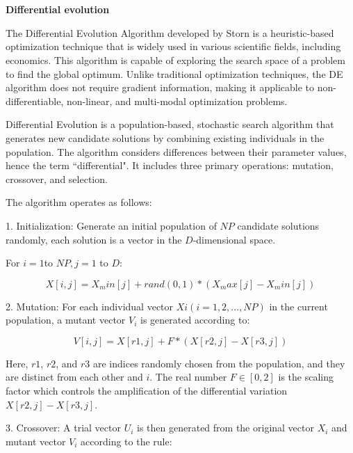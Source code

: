 \documentclass[a4paper,12pt]{article}
\newcommand{\citeyearonly}[1]{\citeyearpar{#1}}
\begin{document}
\newpage

%




\clearpage

\appendix
\section{}\label{appendix:Differential evolution}
\textbf{Differential evolution}

The Differential Evolution Algorithm developed by Storn \citeyearonly{storn1997differential} is a heuristic-based optimization technique that is widely used in various scientific fields, including economics. This algorithm is capable of exploring the search space of a problem to find the global optimum. Unlike traditional optimization techniques, the DE algorithm does not require gradient information, making it applicable to non-differentiable, non-linear, and multi-modal optimization problems.

Differential Evolution is a population-based, stochastic search algorithm that generates new candidate solutions by combining existing individuals in the population. The algorithm considers differences between their parameter values, hence the term ``differential". It includes three primary operations: mutation, crossover, and selection.

The algorithm operates as follows:

1. Initialization: Generate an initial population of $NP$ candidate solutions randomly, each solution is a vector in the $D$-dimensional space.
    
    For $i = 1 $to $NP, j = 1$ to $D$:
    
    $$X[i, j] = X_min[j] + rand(0, 1) * (X_max[j] - X_min[j])$$
    
2. Mutation: For each individual vector $Xi (i=1, 2, ..., NP)$ in the current population, a mutant vector $V_i$ is generated according to:

    $$V[i, j] = X[r1, j] + F * (X[r2, j] - X[r3, j])$$

    Here, $r1$, $r2$, and $r3$ are indices randomly chosen from the population, and they are distinct from each other and $i$. The real number $F \in [0,2]$ is the scaling factor which controls the amplification of the differential variation $X[r2, j] - X[r3, j]$.

3. Crossover: A trial vector $U_i$ is then generated from the original vector $X_i$ and mutant vector $V_i$ according to the rule:
\end{document}
